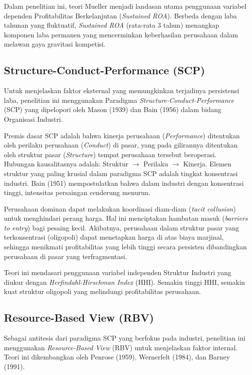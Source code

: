 \documentclass[12pt,a4paper]{report}
\begin{document}
Dalam penelitian ini, teori Mueller menjadi landasan utama penggunaan variabel dependen Profitabilitas Berkelanjutan (\textit{Sustained ROA}). Berbeda dengan laba tahunan yang fluktuatif, \textit{Sustained ROA} (rata-rata 3 tahun) menangkap komponen laba permanen yang mencerminkan keberhasilan perusahaan dalam melawan gaya gravitasi kompetisi.

\subsection{Structure-Conduct-Performance (SCP)}

Untuk menjelaskan faktor eksternal yang memungkinkan terjadinya persistensi laba, penelitian ini menggunakan Paradigma \textit{Structure-Conduct-Performance} (SCP) yang dipelopori oleh Mason (1939) dan Bain (1956) dalam bidang Organisasi Industri.

Premis dasar SCP adalah bahwa kinerja perusahaan (\textit{Performance}) ditentukan oleh perilaku perusahaan (\textit{Conduct}) di pasar, yang pada gilirannya ditentukan oleh struktur pasar (\textit{Structure}) tempat perusahaan tersebut beroperasi. Hubungan kausalitasnya adalah: Struktur $\rightarrow$ Perilaku $\rightarrow$ Kinerja. Elemen struktur yang paling krusial dalam paradigma SCP adalah tingkat konsentrasi industri. Bain (1951) mempostulatkan bahwa dalam industri dengan konsentrasi tinggi, intensitas persaingan cenderung menurun.

Perusahaan dominan dapat melakukan koordinasi diam-diam (\textit{tacit collusion}) untuk menghindari perang harga. Hal ini menciptakan hambatan masuk (\textit{barriers to entry}) bagi pesaing kecil. Akibatnya, perusahaan dalam struktur pasar yang terkonsentrasi (oligopoli) dapat menetapkan harga di atas biaya marjinal, sehingga menikmati profitabilitas yang lebih tinggi secara persisten dibandingkan perusahaan di pasar yang terfragmentasi.

Teori ini mendasari penggunaan variabel independen Struktur Industri yang diukur dengan \textit{Herfindahl-Hirschman Index} (HHI). Semakin tinggi HHI, semakin kuat struktur oligopoli yang melindungi profitabilitas perusahaan.

\subsection{Resource-Based View (RBV)}

Sebagai antitesis dari paradigma SCP yang berfokus pada industri, penelitian ini menggunakan \textit{Resource-Based View} (RBV) untuk menjelaskan faktor internal. Teori ini dikembangkan oleh Penrose (1959), Wernerfelt (1984), dan Barney (1991).
\end{document}
